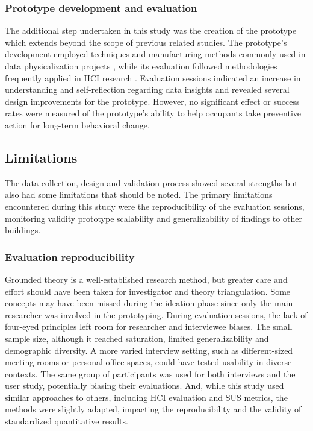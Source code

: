 \subsubsection{Prototype development and evaluation}
The additional step undertaken in this study was the creation of the prototype which extends beyond the scope of previous related studies. The prototype's development employed techniques and manufacturing methods commonly used in data physicalization projects \cite{alexander_data_2019, jansen_opportunities_2015}, while its evaluation followed methodologies frequently applied in HCI research \cite{ranasinghe_encoding_2023, sauve_physecology_2022}. Evaluation sessions indicated an increase in understanding and self-reflection regarding data insights and revealed several design improvements for the prototype. However, no significant effect or success rates were measured of the prototype's ability to help occupants take preventive action for long-term behavioral change.

\subsection{Limitations}

The data collection, design and validation process showed several strengths but also had some limitations that should be noted. The primary limitations encountered during this study were the reproducibility of the evaluation sessions, monitoring validity prototype scalability and generalizability of findings to other buildings.

\subsubsection{Evaluation reproducibility}

Grounded theory is a well-established research method, but greater care and effort should have been taken for investigator and theory triangulation. Some concepts may have been missed during the ideation phase since only the main researcher was involved in the prototyping. During evaluation sessions, the lack of four-eyed principles left room for researcher and interviewee biases. The small sample size, although it reached saturation, limited generalizability and demographic diversity. A more varied interview setting, such as different-sized meeting rooms or personal office spaces, could have tested usability in diverse contexts. The same group of participants was used for both interviews and the user study, potentially biasing their evaluations. And, while this study used similar approaches to others, including HCI evaluation and SUS metrics, the methods were slightly adapted, impacting the reproducibility and the validity of standardized quantitative results. 

